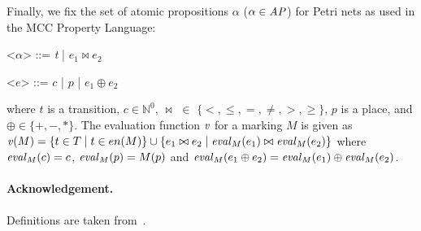 \documentclass{article}
\begin{document}
Finally, we fix the set of atomic propositions $\alpha$ ($\alpha \in \mathit{AP}$) 
for Petri nets as used in the MCC Property Language:
\begin{grammar}
    \let\syntleft\relax
    \let\syntright\relax
    <$\alpha$> ::= \textit{t} |  $e_1 \bowtie e_2$

    <$e$> ::= $c$ | $p$ | $e_1 \oplus e_2$
\end{grammar}
where  $t$ is a transition, $c \in \mathbb{N}^0$, $\bowtie$ $\in$ $\{<, \leq, =, \neq, >, \geq\}$, $p$ is a place, and $\oplus \in \{ +, -, * \}$.
The evaluation function $\mathit{v}$ for a marking $M$ is given as
$\apeval(M) = \{ t \in T \mid t \in \en(M) \} \cup
\{ e_1 \bowtie e_2 \mid \eval[M][e_1] \bowtie \eval[M][e_2]\}$
where $\eval[M][c] = c$, $\eval[M][p] = M(p)$ and
$\eval[M][e_{1} \oplus e_{2}] = \eval[M][e_{1}] \oplus \eval[M][e_{2}]$.

\paragraph{Acknowledgement.} Definitions are taken from~\cite{BDJJS:PN:18}.



\end{document}

